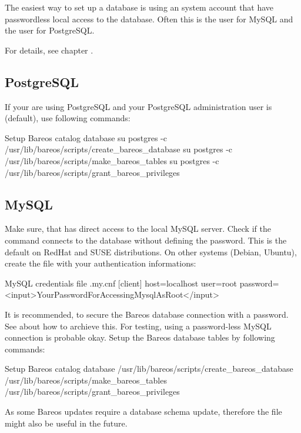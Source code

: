 The easiest way to set up a database is using an system account that have passwordless local access to the database. 
Often this is the user  for MySQL and the user  for PostgreSQL.

For details, see chapter .

\subsection{PostgreSQL}
If your are using PostgreSQL and your PostgreSQL administration user is  (default), use following commands:

\begin{commands}{Setup Bareos catalog database}
su postgres -c /usr/lib/bareos/scripts/create_bareos_database
su postgres -c /usr/lib/bareos/scripts/make_bareos_tables
su postgres -c /usr/lib/bareos/scripts/grant_bareos_privileges
\end{commands}


\subsection{MySQL}
Make sure, that  has direct access to the local MySQL server. 
Check if the command  connects to the database without defining the password.
This is the default on RedHat and SUSE distributions. 
On other systems (Debian, Ubuntu),
create the file  with your authentication informations:

\begin{config}{MySQL credentials file .my.cnf}
[client]
host=localhost
user=root
password=<input>YourPasswordForAccessingMysqlAsRoot</input>
\end{config}

It is recommended, to secure the Bareos database connection with a password.
See  about how to archieve this.
For testing, using a password-less MySQL connection is probable okay.
Setup the Bareos database tables by following commands:
\begin{commands}{Setup Bareos catalog database}
/usr/lib/bareos/scripts/create_bareos_database
/usr/lib/bareos/scripts/make_bareos_tables
/usr/lib/bareos/scripts/grant_bareos_privileges
\end{commands}

As some Bareos updates require a database schema update,
therefore the file  might also be useful in the future.


